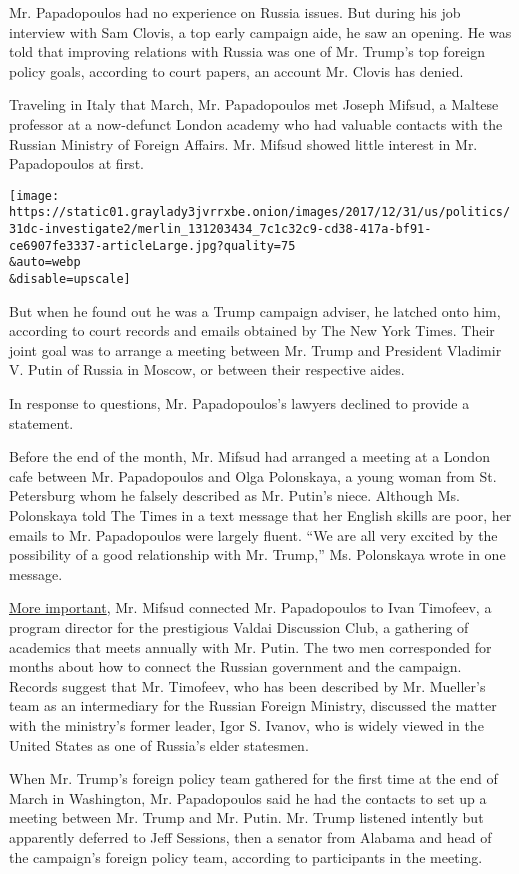 Mr. Papadopoulos had no experience on Russia issues. But during his job
interview with Sam Clovis, a top early campaign aide, he saw an opening.
He was told that improving relations with Russia was one of Mr. Trump's
top foreign policy goals, according to court papers, an account Mr.
Clovis has denied.

Traveling in Italy that March, Mr. Papadopoulos met Joseph Mifsud, a
Maltese professor at a now-defunct London academy who had valuable
contacts with the Russian Ministry of Foreign Affairs. Mr. Mifsud showed
little interest in Mr. Papadopoulos at first.

\texttt{[image: https://static01.graylady3jvrrxbe.onion/images/2017/12/31/us/politics/31dc-investigate2/merlin\_131203434\_7c1c32c9-cd38-417a-bf91-ce6907fe3337-articleLarge.jpg?quality=75\\\&auto=webp\\\&disable=upscale]}

But when he found out he was a Trump campaign adviser, he latched onto
him, according to court records and emails obtained by The New York
Times. Their joint goal was to arrange a meeting between Mr. Trump and
President Vladimir V. Putin of Russia in Moscow, or between their
respective aides.

In response to questions, Mr. Papadopoulos's lawyers declined to provide
a statement.

Before the end of the month, Mr. Mifsud had arranged a meeting at a
London cafe between Mr. Papadopoulos and Olga Polonskaya, a young woman
from St. Petersburg whom he falsely described as Mr. Putin's niece.
Although Ms. Polonskaya told The Times in a text message that her
English skills are poor, her emails to Mr. Papadopoulos were largely
fluent. ``We are all very excited by the possibility of a good
relationship with Mr. Trump,'' Ms. Polonskaya wrote in one message.

\href{https://www.nytimes3xbfgragh.onion/2017/11/10/us/russia-inquiry-trump.html}{More
important}, Mr. Mifsud connected Mr. Papadopoulos to Ivan Timofeev, a
program director for the prestigious Valdai Discussion Club, a gathering
of academics that meets annually with Mr. Putin. The two men
corresponded for months about how to connect the Russian government and
the campaign. Records suggest that Mr. Timofeev, who has been described
by Mr. Mueller's team as an intermediary for the Russian Foreign
Ministry, discussed the matter with the ministry's former leader, Igor
S. Ivanov, who is widely viewed in the United States as one of Russia's
elder statesmen.

When Mr. Trump's foreign policy team gathered for the first time at the
end of March in Washington, Mr. Papadopoulos said he had the contacts to
set up a meeting between Mr. Trump and Mr. Putin. Mr. Trump listened
intently but apparently deferred to Jeff Sessions, then a senator from
Alabama and head of the campaign's foreign policy team, according to
participants in the meeting.

